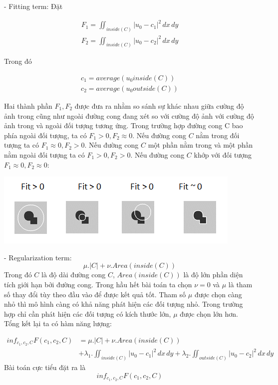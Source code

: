 \documentclass[12pt,oneside,a4]{report}
\begin{document}
- Fitting term: Đặt

\begin{center}
\begin{align}
F_1=\iint_{inside(C)} |u_0-c_1|^2 \,dx\,dy\\
F_2=\iint_{inside(C)} |u_0-c_2|^2 \,dx\,dy
\end{align}
\end{center}
Trong đó
\begin{center}
\begin{align}
c_1=average(u_0 inside(C))\\
c_2=average(u_0 outside(C))
\end{align}
\end{center} 
Hai thành phần $F_1, F_2$ được đưa ra nhằm so sánh sự khác nhau giữa cường độ ảnh trong cũng như ngoài đường cong đang xét so với cường độ ảnh với cường độ ảnh trong và ngoài đối tượng tương ứng. Trong trường hợp đường cong C bao phía ngoài đối tượng, ta có $F_1>0, F_2\approx 0$. Nếu đường cong $C$ nằm trong đối tượng ta có $F_1 \approx0, F_2> 0$. Nếu đường cong $C$ một phần nằm trong và một phần nằm ngoài đối tượng ta có $F_1>0, F_2> 0$. Nếu đường cong $C$ khớp với đối tượng $F_1 \approx 0, F_2\approx 0$:
\begin{center}
\includegraphics[scale=1]{figure/fitting.png}
\end{center}
- Regularization term:
\begin{equation}
\mu .|C|+\nu .Area(inside(C))
\end{equation}
Trong đó $C$ là độ dài đường cong $C$, $Area(inside(C))$ là độ lớn phần diện tích giới hạn bởi đường cong. Trong hầu hết bài toán ta chọn $\nu=0$ và $\mu$ là tham số thay đổi tùy theo đầu vào để được kết quả tốt. Tham số $\mu $ được chọn càng nhỏ thì mô hình càng có khả năng phát hiện các đối tượng nhỏ. Trong trường hợp chỉ cần phát hiện các đối tượng có kích thước lớn, $\mu$ được chọn lớn hơn.\\

Tổng kết lại ta có hàm năng lượng: 

\begin{equation}
\begin{split}
inf_{c_1,c_2,C} F(c_1, c_2, C)&=\mu .|C|+\nu .Area(inside(C)) \\ 
&+\lambda_1 .\iint_{inside(C)} |u_0-c_1|^2 \,dx\,dy+\lambda_2 .\iint_{outside(C)} |u_0-c_2|^2 \,dx\,dy
\end{split}
\end{equation}
Bài toán cực tiểu đặt ra là
\begin{equation}
inf_{c_1,c_2,C} F(c_1, c_2, C)
\end{equation}
 
\end{document}
